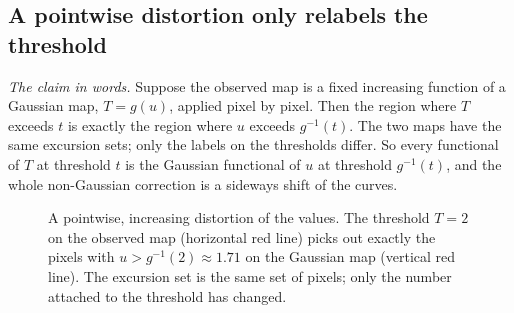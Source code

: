 \subsection{A pointwise distortion only relabels the threshold}
\label{T3a:sec:relabel}

\emph{The claim in words.} Suppose the observed map is a fixed increasing function of a Gaussian map, $T=g(u)$, applied pixel by pixel. Then the region where $T$ exceeds $t$ is exactly the region where $u$ exceeds $g^{-1}(t)$. The two maps have the same excursion sets; only the labels on the thresholds differ. So every functional of $T$ at threshold $t$ is the Gaussian functional of $u$ at threshold $g^{-1}(t)$, and the whole non-Gaussian correction is a sideways shift of the curves.

\begin{figure}[htbp]
\centering
{}
\caption{A pointwise, increasing distortion of the values. The threshold $T=2$ on the observed map (horizontal red line) picks out exactly the pixels with $u>g^{-1}(2)\approx1.71$ on the Gaussian map (vertical red line). The excursion set is the same set of pixels; only the number attached to the threshold has changed.}
\label{T3a:fig:relabel}
\end{figure}

